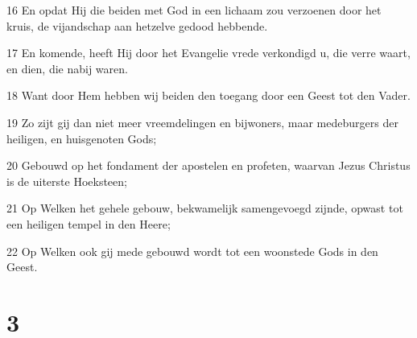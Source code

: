 \par 16 En opdat Hij die beiden met God in een lichaam zou verzoenen door het kruis, de vijandschap aan hetzelve gedood hebbende.
\par 17 En komende, heeft Hij door het Evangelie vrede verkondigd u, die verre waart, en dien, die nabij waren.
\par 18 Want door Hem hebben wij beiden den toegang door een Geest tot den Vader.
\par 19 Zo zijt gij dan niet meer vreemdelingen en bijwoners, maar medeburgers der heiligen, en huisgenoten Gods;
\par 20 Gebouwd op het fondament der apostelen en profeten, waarvan Jezus Christus is de uiterste Hoeksteen;
\par 21 Op Welken het gehele gebouw, bekwamelijk samengevoegd zijnde, opwast tot een heiligen tempel in den Heere;
\par 22 Op Welken ook gij mede gebouwd wordt tot een woonstede Gods in den Geest.

\chapter{3}


